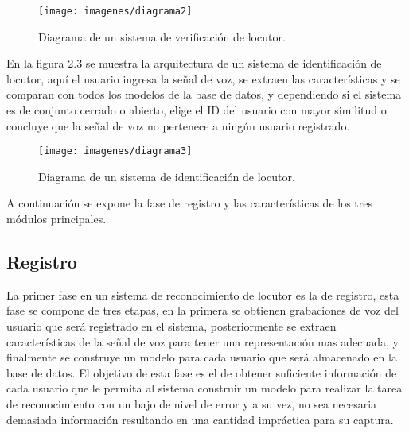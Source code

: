 \begin{figure}[H]
	\begin{center}
	\texttt{[image: imagenes/diagrama2]} \\
	\caption{Diagrama de un sistema de verificaci\'on de locutor.}
	\label{fig:diag_verif_locutor}
	\end{center}
\end{figure}

En la figura 2.3 se muestra la arquitectura de un sistema de identificaci\'on de locutor, aqu\'i el usuario ingresa la señal de voz, se extraen las caracter\'isticas y se comparan con todos los modelos de la base de datos, y dependiendo si el sistema es de conjunto cerrado o abierto, elige el ID  del usuario con mayor similitud o concluye que la señal de voz no pertenece a ning\'un usuario registrado.\\

\begin{figure}[H]
	\begin{center}
	\texttt{[image: imagenes/diagrama3]} \\
	\caption{Diagrama de un sistema de identificaci\'on de locutor.}
	\label{fig:diag_clasif_locutor}
	\end{center}
\end{figure}

A continuaci\'on se expone la fase de registro y las caracter\'isticas de los tres m\'odulos principales.\\


\subsection{Registro}
La primer fase en un sistema de reconocimiento de locutor es la de registro, esta fase se compone de tres etapas, en la primera se obtienen grabaciones de voz del usuario que ser\'a registrado en el sistema, posteriormente se extraen caracter\'isticas de la señal de voz para tener una representac\i\'on mas adecuada, y finalmente se construye un modelo para cada usuario que ser\'a almacenado en la base de datos. El objetivo de esta fase es el de obtener suficiente informaci\'on de cada usuario que le permita al sistema construir un modelo para realizar la tarea de reconocimiento con un bajo de nivel de error y a su vez, no sea necesaria demasiada informaci\'on resultando en una cantidad impr\'actica para su captura.\\

